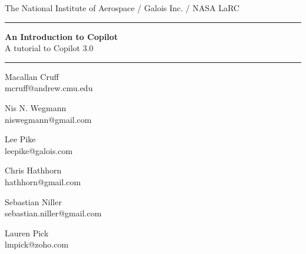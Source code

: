 \documentclass[12pt]{article}
\theoremstyle{example}
\newcommand{\HRule}{\rule{\linewidth}{0.25pt}}
\begin{document}
\thispagestyle{empty}

\begin{center}

The National Institute of Aerospace / Galois Inc. / NASA LaRC

\vspace{0.1cm}

\HRule

\vspace{0.6cm}

{\Huge \bfseries
An Introduction to Copilot
}\\
A tutorial to Copilot 3.0
\HRule

\vspace{1cm}

\begin{minipage}{0.3\textwidth}
\large
\begin{center}
Macallan Cruff\\
\small{
mcruff@andrew.cmu.edu\\
}
\end{center}
\end{minipage}
\begin{minipage}{0.3\textwidth}
\large
\begin{center}
Nis N. Wegmann\\
\small{
niswegmann@gmail.com\\
}
\end{center}
\end{minipage}

\vspace{1cm}

\begin{minipage}{0.3\textwidth}
\large
\begin{center}
Lee Pike\\
\small{
leepike@galois.com\\
}
\end{center}
\end{minipage}
\begin{minipage}{0.3\textwidth}
\large
\begin{center}
Chris Hathhorn \\
\small{
hathhorn@gmail.com\\
}
\end{center}
\end{minipage}
\vspace{1cm}


\begin{minipage}{0.3\textwidth}
\large
\begin{center}
Sebastian Niller\\
\small{
sebastian.niller@gmail.com\\
}
\end{center}
\end{minipage}
\begin{minipage}{0.3\textwidth}
\large
\begin{center}
Lauren Pick\\
\small{
lmpick@zoho.com\\
}
\end{center}
\end{minipage}
\vspace{1cm}



\end{center}
\end{document}
